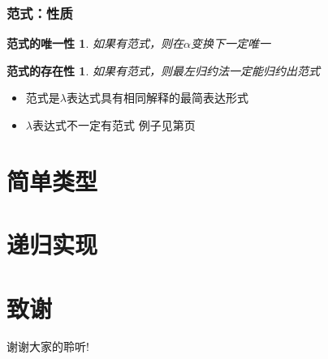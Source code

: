\documentclass[CJKutf8,compress,hyperref]{beamer}
\begin{document}
\begin{CJK}{UTF8}{song}
\begin{frame}
  \frametitle{范式：性质} 
  \newtheorem{Parad_uniq}{范式的唯一性} 
  \begin{Parad_uniq}
    如果有范式，则在$\alpha$变换下一定唯一 
  \end{Parad_uniq}
  \newtheorem{Parad_exist}{范式的存在性} 
  \begin{Parad_exist}
    如果有范式，则最左归约法一定能归约出范式 
  \end{Parad_exist}
  \begin{itemize}
  \item 范式是$\lambda$表达式具有相同解释的最简表达形式 
  \item $\lambda$表达式不一定有范式 例子见第\pageref{ambig}页
  \end{itemize}
\end{frame} 

\section{简单类型} 
\section{递归实现} 

\section{致谢}
\begin{frame}
  \begin{Huge}
    \begin{center}
      谢谢大家的聆听!
    \end{center}
  \end{Huge}
\end{frame}
\end{CJK}
\end{document}
